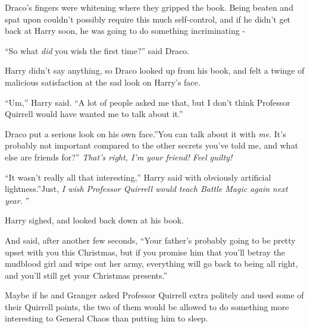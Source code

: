 Draco's fingers were whitening where they gripped the book. Being beaten
and spat upon couldn't possibly require this much self-control, and if
he didn't get back at Harry soon, he was going to do something
incriminating -

``So what \emph{did} you wish the first time?'' said Draco.

Harry didn't say anything, so Draco looked up from his book, and felt a
twinge of malicious satisfaction at the sad look on Harry's face.

``Um,'' Harry said. ``A lot of people asked me that, but I don't think
Professor Quirrell would have wanted me to talk about it.''

Draco put a serious look on his own face.''You can talk about it with
\emph{me}. It's probably not important compared to the other secrets
you've told me, and what else are friends for?'' \emph{That's right, I'm
your friend! Feel guilty!}

``It wasn't really all that interesting,'' Harry said with obviously
artificial lightness.''Just, \emph{I wish Professor Quirrell would teach
Battle Magic again next year.} ''

Harry sighed, and looked back down at his book.

And said, after another few seconds, ``Your father's probably going to
be pretty upset with you this Christmas, but if you promise him that
you'll betray the mudblood girl and wipe out her army, everything will
go back to being all right, and you'll still get your Christmas
presents.''

Maybe if he and Granger asked Professor Quirrell extra politely and used
some of their Quirrell points, the two of them would be allowed to do
something more interesting to General Chaos than putting him to sleep.
